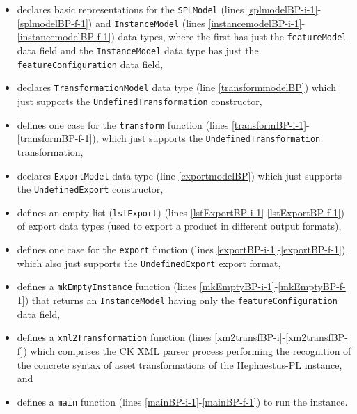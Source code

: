 \begin{itemize}

\item declares basic representations for the \texttt{SPLModel} (lines \ref{splmodelBP-i-1}-\ref{splmodelBP-f-1}) and \texttt{InstanceModel} (lines \ref{instancemodelBP-i-1}-\ref{instancemodelBP-f-1}) data types, where the first
has just the \texttt{featureModel} data field
and the \texttt{InstanceModel} data type has just the \texttt{featureConfiguration} data field,

\item declares \texttt{TransformationModel} data type (line \ref{transformmodelBP}) which just supports the \texttt{UndefinedTransformation} constructor,

\item defines one case for the \texttt{transform} function (lines \ref{transformBP-i-1}-\ref{transformBP-f-1}), which just supports the \texttt{UndefinedTransformation} transformation,

\item declares \texttt{ExportModel} data type (line \ref{exportmodelBP}) which just supports the \texttt{UndefinedExport} constructor,

\item defines an empty list (\texttt{lstExport}) (lines \ref{lstExportBP-i-1}-\ref{lstExportBP-f-1}) of export data types (used to export a product in different output formats),

\item defines one case for the \texttt{export} function (lines \ref{exportBP-i-1}-\ref{exportBP-f-1}), which also just supports the \texttt{UndefinedExport} export format,

\item defines a \texttt{mkEmptyInstance} function (lines \ref{mkEmptyBP-i-1}-\ref{mkEmptyBP-f-1}) that returns an \texttt{InstanceModel} having only the \texttt{featureConfiguration} data field,

\item defines a \texttt{xml2Transformation} function (lines \ref{xm2transfBP-i}-\ref{xm2transfBP-f}) which comprises the CK XML parser process performing the recognition of the concrete syntax of asset transformations of the Hephaestus-PL instance, and

\item defines a \texttt{main} function (lines \ref{mainBP-i-1}-\ref{mainBP-f-1}) to run the \hp{} instance.

\end{itemize}

